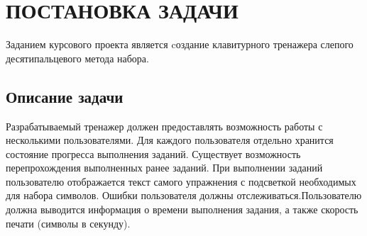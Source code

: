 \section{ПОСТАНОВКА ЗАДАЧИ}
\label{sec:program}

\vspace{0.6cm}
Заданием курсового проекта является cоздание клавитурного тренажера слепого десятипальцевого метода набора.

\subsection{Описание задачи}
\label{subsec:task-description}

Разрабатываемый тренажер должен предоставлять возможность работы с несколькими пользователями. Для каждого
пользователя отдельно хранится состояние прогресса выполнения заданий. Существует возможность перепрохождения
выполненных ранее заданий.
При выполнении заданий пользователю отображается текст самого упражнения с подсветкой необходимых для набора символов.
Ошибки пользователя должны отслеживаться.Пользователю должна выводится информация о времени выполнения задания,
а также скорость печати (символы в секунду).
